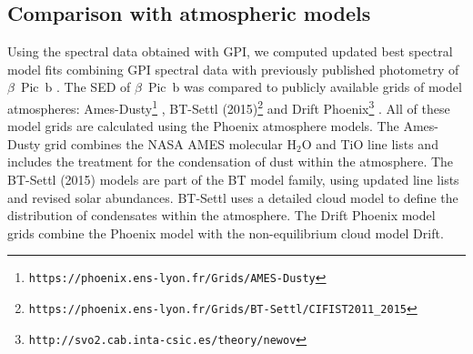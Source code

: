 \documentclass[twocolumn]{aastex6}
\begin{document}
\subsection{Comparison with atmospheric models}
\label{sec:atmo_models}
\begin{figure*}
\caption{The best fit models within each of the three atmospheric model grids found using only the photometric measurements (blue dashed curve) and using both the photometric and spectroscopic measurements (red solid curve) of $\beta$~Pic~b. The photometric measurements of $\beta$~Pic~b compiled by \citet{Morzinski2015} are plotted as black points, while the GPI spectra presented in this study are plotted as light gray points. Synthetic photometry (open blue and red squares) was computed for each model using the filter profiles shown in Figure~\ref{fig:SED}.}
\label{fig:SED_fitted}
\end{figure*}
\begin{figure*}
\caption{Goodness of fit statistic ($\chi^2_{\nu}$) for the {\sc Ames-Dusty}, {\sc BT-Settl} (2015) and {\sc Drift Phoenix} model grids as a function of effective temperature and surface gravity. Grid points are indicated with light-gray diamonds. The points between model grid points were linearlly interpolated version of the grid, with a spacing of 1\,K for $T_{\rm eff}$ and 0.005\,[dex] for $\log g$. The best fit model within the original grid is indicated by a large diamond, with the best fit model within the interpolated grid indicated by a circle. The white contours indicate the 68\,\% (solid), 95\,\% (dashed), and 99\,\% (dotted) confidence intervals, calculated using the $\chi^2$.}
\label{fig:logg_teff}
\end{figure*}

Using the spectral data obtained with GPI, we computed updated best spectral model fits combining GPI spectral data with previously published photometry of $\beta$~Pic~b \citep{Lagrange2009,Quanz2010,Bonnefoy2011,Currie2011b,Bonnefoy2013,Currie2013,Absil2013,Males2014,Morzinski2015}. The SED of $\beta$~Pic~b was compared to publicly available grids of model atmospheres: {\sc Ames-Dusty}\footnote{{\tt https://phoenix.ens-lyon.fr/Grids/AMES-Dusty}} \citep{Chabrier2000,Allard2001}, {\sc BT-Settl} (2015)\footnote{{\tt https://phoenix.ens-lyon.fr/Grids/BT-Settl/CIFIST2011\_2015}} \citep{Allard2012} and {\sc Drift Phoenix}\footnote{{\tt http://svo2.cab.inta-csic.es/theory/newov}} \citep{Helling2008,Woitke2003,Helling2006}. All of these model grids are calculated using the {\sc Phoenix} atmosphere models. The {\sc Ames-Dusty} grid combines the NASA AMES molecular H$_2$O and TiO line lists and includes the treatment for the condensation of dust within the atmosphere. The {\sc BT-Settl} (2015) models are part of the BT model family, using updated line lists and revised solar abundances. {\sc BT-Settl} uses a detailed cloud model to define the distribution of condensates within the atmosphere. The {\sc Drift Phoenix} model grids combine the {\sc Phoenix} model with the non-equilibrium cloud model {\sc Drift}.
\end{document}

